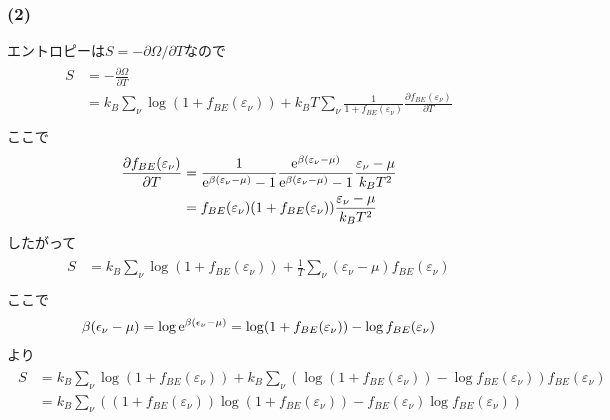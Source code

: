 \subsubsection*{(2)}
エントロピーは$S=-\partial\Omega/\partial T$なので
\begin{align}
  \begin{split}
    S&=-\frac{\partial\Omega}{\partial T}\\
    &=k_B\sum_\nu\log(1+f_{BE}(\varepsilon_\nu))+k_BT\sum_\nu\frac{1}{1+f_{BE}(\varepsilon_\nu)}\frac{\partial f_{BE}(\varepsilon_\nu)}{\partial T}\\
  \end{split}
\end{align}
ここで
\begin{align}
  \begin{split}
    \frac{\partial f_{BE}(\varepsilon_\nu)}{\partial T}&=\frac{1}{{\rm e}^{\beta(\varepsilon_\nu-\mu)}-1}\frac{{\rm e}^{\beta(\varepsilon_\nu-\mu)}}{{\rm e}^{\beta(\varepsilon_\nu-\mu)}-1}\frac{\varepsilon_\nu-\mu}{k_BT^2}\\
    &=f_{BE}(\varepsilon_\nu)(1+f_{BE}(\varepsilon_\nu))\frac{\varepsilon_\nu-\mu}{k_BT^2}
  \end{split}
\end{align}
したがって
\begin{align}
  \begin{split}
  S&=k_B\sum_\nu\log(1+f_{BE}(\varepsilon_\nu))+\frac{1}{T}\sum_\nu(\varepsilon_\nu-\mu)f_{BE}(\varepsilon_\nu)\\
  \end{split}
\end{align}
ここで
\begin{align}
  \beta(\epsilon_\nu-\mu)=\log{\rm e}^{\beta(\epsilon_\nu-\mu)}=\log(1+f_{BE}(\varepsilon_\nu))-\log f_{BE}(\varepsilon_\nu)
\end{align}
より
\begin{align}
  \begin{split}
    S&=k_B\sum_\nu\log(1+f_{BE}(\varepsilon_\nu))+k_B\sum_\nu\left(\log(1+f_{BE}(\varepsilon_\nu))-\log f_{BE}(\varepsilon_\nu)\right)f_{BE}(\varepsilon_\nu)\\
    &=k_B\sum_\nu\left((1+f_{BE}(\varepsilon_\nu))\log (1+f_{BE}(\varepsilon_\nu))-f_{BE}(\varepsilon_\nu)\log f_{BE}(\varepsilon_\nu)\right)
  \end{split}
\end{align}

